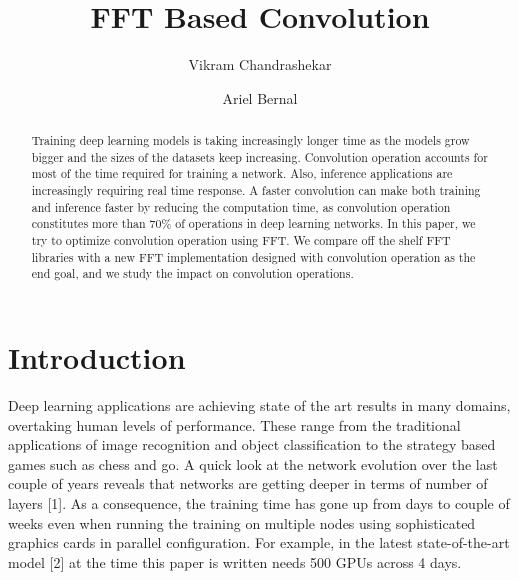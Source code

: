 \documentclass[sigconf]{acmart}
\begin{document}
\title{FFT Based Convolution}

\author{Vikram Chandrashekar}
\author{Ariel Bernal}

\renewcommand{\shortauthors}{A.Bernal}


\begin{abstract}
Training deep learning models is taking increasingly longer time as the models grow bigger and the sizes of the datasets keep increasing. Convolution operation accounts for most of the time required for training a network. Also, inference applications are increasingly requiring real time response. A faster convolution can make both training and inference faster by reducing the computation time, as convolution operation constitutes more than 70\% of operations in deep learning networks. In this paper, we try to optimize convolution operation using FFT. We compare off the shelf FFT libraries with a new FFT implementation designed with convolution operation as the end goal, and we study the impact on convolution operations.
\end{abstract}




\maketitle

\section{Introduction}

Deep learning applications are achieving state of the art results in many domains, overtaking human levels of performance. These range from the traditional applications of image recognition and object classification to the strategy based games such as chess and go. A quick look at the network evolution over the last couple of years reveals that networks are getting deeper in terms of number of layers [1]. As a consequence, the training time has gone up from days to couple of weeks even when running the training on multiple nodes using sophisticated graphics cards in parallel configuration. For example, in the latest state-of-the-art model [2] at the time this paper is written needs 500 GPUs across 4 days.
\end{document}
